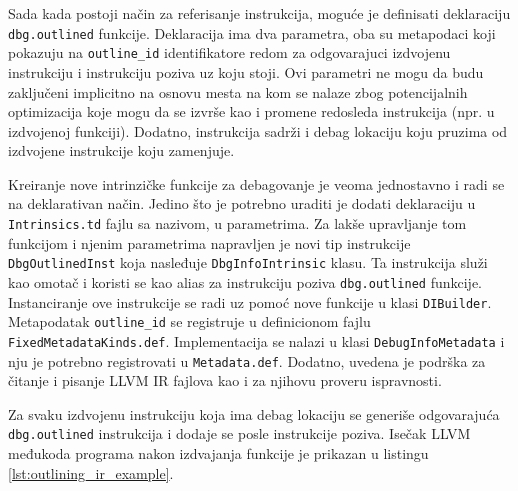 \documentclass[12pt,oneside]{memoir}
\begin{document}
Sada kada postoji način za referisanje instrukcija, moguće je definisati deklaraciju \verb|dbg.outlined| funkcije.
Deklaracija ima dva parametra, oba su metapodaci koji pokazuju na \verb|outline_id| identifikatore redom za odgovarajuci izdvojenu instrukciju i instrukciju poziva uz koju stoji.
Ovi parametri ne mogu da budu zaključeni implicitno na osnovu mesta na kom se nalaze zbog potencijalnih optimizacija koje mogu da se izvrše kao i promene redosleda instrukcija (npr. u izdvojenoj funkciji).
Dodatno, instrukcija sadrži i debag lokaciju koju pruzima od izdvojene instrukcije koju zamenjuje.

Kreiranje nove intrinzičke funkcije za debagovanje je veoma jednostavno i radi se na deklarativan način.
Jedino što je potrebno uraditi je dodati deklaraciju u \verb|Intrinsics.td| fajlu sa nazivom, u parametrima.
Za lakše upravljanje tom funkcijom i njenim parametrima napravljen je novi tip instrukcije \verb|DbgOutlinedInst| koja nasleđuje \verb|DbgInfoIntrinsic| klasu.
Ta instrukcija služi kao omotač i koristi se kao alias za instrukciju poziva \verb|dbg.outlined| funkcije. 
Instanciranje ove instrukcije se radi uz pomoć nove funkcije u klasi \verb|DIBuilder|.
Metapodatak \verb|outline_id| se registruje u definicionom fajlu \verb|FixedMetadataKinds.def|.
Implementacija se nalazi u klasi \verb|DebugInfoMetadata| i nju je potrebno registrovati u \verb|Metadata.def|.
Dodatno, uvedena je podrška za čitanje i pisanje LLVM IR fajlova kao i za njihovu proveru ispravnosti. 

Za svaku izdvojenu instrukciju koja ima debag lokaciju se generiše odgovarajuća \verb|dbg.outlined| instrukcija i dodaje se posle instrukcije poziva.
Isečak LLVM međukoda programa nakon izdvajanja funkcije je prikazan u listingu \ref{lst:outlining_ir_example}.
\end{document}

